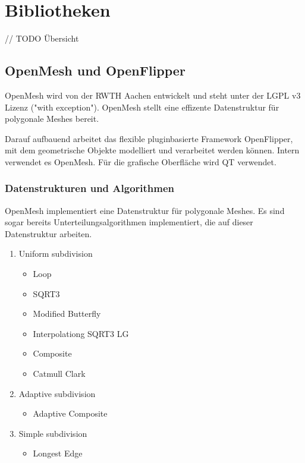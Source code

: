 \chapter{Bibliotheken}

// TODO Übersicht



\section{OpenMesh und OpenFlipper}

OpenMesh wird von der \acs{RWTH} Aachen entwickelt und steht unter der \acs{LGPL} v3 Lizenz ("with exception"). OpenMesh stellt eine effizente Datenstruktur für polygonale Meshes bereit.

Darauf aufbauend arbeitet das flexible pluginbasierte Framework OpenFlipper, mit dem geometrische Objekte modelliert und verarbeitet werden können. Intern verwendet es OpenMesh. Für die grafische Oberfläche wird QT verwendet.

\subsection{Datenstrukturen und Algorithmen}

OpenMesh implementiert eine Datenstruktur für polygonale Meshes. Es sind sogar bereits Unterteilungsalgorithmen implementiert, die auf dieser Datenstruktur arbeiten.

\begin{enumerate}
\item Uniform subdivision
\begin{itemize}
	\item Loop
	\item SQRT3
	\item Modified Butterfly
	\item Interpolationg SQRT3 LG
	\item Composite
	\item Catmull Clark
\end{itemize}
\item Adaptive subdivision
\begin{itemize}
	\item Adaptive Composite
\end{itemize}
\item Simple subdivision
\begin{itemize}
	\item Longest Edge
\end{itemize}
\end{enumerate}

